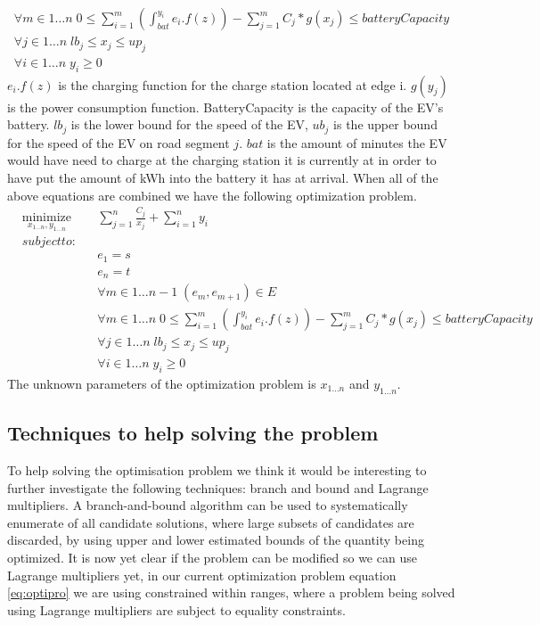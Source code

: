 \begin{gather}
\forall{m \in 1 \dots n} \; 0 \leq \sum_{i=1}^{m} \left( \int_{bat}^{y_i} e_i.f(z) \right) - \sum_{j=1}^{m} C_j*g(x_j) \leq batteryCapacity \\
\forall{j \in 1 \dots n} \; lb_j \leq x_j \leq up_j \\
\forall{i \in 1 \dots n} \; y_i \geq 0
\end{gather}\label{eq:physicalconstraints}
$e_i.f(z)$ is the charging function for the charge station located at edge i. $g(y_j)$ is the power consumption function. BatteryCapacity is the capacity of the EV's battery. 
$lb_j$ is the lower bound for the speed of the EV, $ub_j$ is the upper bound for the speed of the EV on road segment $j$. $bat$ is the amount of minutes the EV would have need to charge at the charging station it is currently at in order to have put the amount of kWh into the battery it has at arrival. When all of the above equations are combined we have the following optimization problem. 
\begin{equation}
\begin{aligned}
&\underset{x_{1 \dots n},y_{1 \dots n}}{\text{minimize}}
& &\sum_{j=1}^{n} \frac{C_j}{x_j} + \sum_{i=1}^{n} y_i \\
&subject to: \\
&&&e_1 = s \\
&&&e_n = t \\
&&&\forall{m \in 1 \dots n-1} \; (e_m, e_{m+1}) \in E \\
&&&\forall{m \in 1 \dots n} \; 0 \leq \sum_{i=1}^{m} \left( \int_{bat}^{y_i} e_i.f(z) \right) - \sum_{j=1}^{m} C_j*g(x_j) \leq batteryCapacity \\
&&&\forall{j \in 1 \dots n} \; lb_j \leq x_j \leq up_j \\
&&&\forall{i \in 1 \dots n} \; y_i \geq 0 
\end{aligned}
\end{equation} \label{eq:optiproblem}
The unknown parameters of the optimization problem is $x_{1\dots n}$ and $y_{1\dots n}$. 


\subsection{Techniques to help solving the problem}
To help solving the optimisation problem we think it would be interesting to further investigate the following techniques: branch and bound and Lagrange multipliers.
A branch-and-bound algorithm can be used to systematically enumerate  of all candidate solutions, where large subsets of candidates are discarded, by using upper and lower estimated bounds of the quantity being optimized. 
It is now yet clear if the problem can be modified so we can use Lagrange multipliers yet, in our current optimization problem equation \ref{eq:optipro} we are using constrained within ranges, where a problem being solved using Lagrange multipliers are subject to equality constraints.


